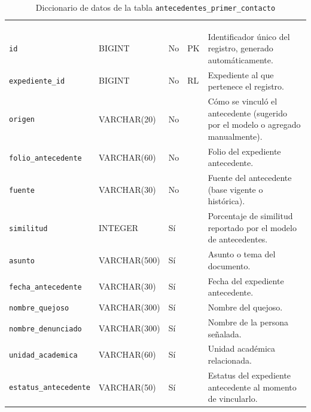 \footnotesize
\renewcommand{\arraystretch}{1.15}
\setlength{\tabcolsep}{4pt}
\begin{longtable}{|L{3.9cm}|L{2.4cm}|L{0.9cm}|L{1.2cm}|L{6.6cm}|}
	\hiderowcolors\caption{Diccionario de datos de la tabla \texttt{antecedentes\_primer\_contacto}}
	\label{tab:dic_antecedentes_primer_contacto} \\ \showrowcolors
	\hline
	 &  &  &  &  \\
	\hline
	\endfirsthead
	\hline
	 &  &  &  &  \\
	\hline
	\endhead
		\texttt{id} & BIGINT & No & PK & Identificador único del registro, generado automáticamente. \\ \hline
		\texttt{expediente\_\allowbreak{}id} & BIGINT & No & RL & Expediente al que pertenece el registro. \\ \hline
		\texttt{origen} & VARCHAR(20) & No &  & Cómo se vinculó el antecedente (sugerido por el modelo o agregado manualmente). \\ \hline
		\texttt{folio\_\allowbreak{}antecedente} & VARCHAR(60) & No &  & Folio del expediente antecedente. \\ \hline
		\texttt{fuente} & VARCHAR(30) & No &  & Fuente del antecedente (base vigente o histórica). \\ \hline
		\texttt{similitud} & INTEGER & Sí &  & Porcentaje de similitud reportado por el modelo de antecedentes. \\ \hline
		\texttt{asunto} & VARCHAR(500) & Sí &  & Asunto o tema del documento. \\ \hline
		\texttt{fecha\_\allowbreak{}antecedente} & VARCHAR(30) & Sí &  & Fecha del expediente antecedente. \\ \hline
		\texttt{nombre\_\allowbreak{}quejoso} & VARCHAR(300) & Sí &  & Nombre del quejoso. \\ \hline
		\texttt{nombre\_\allowbreak{}denunciado} & VARCHAR(300) & Sí &  & Nombre de la persona señalada. \\ \hline
		\texttt{unidad\_\allowbreak{}academica} & VARCHAR(60) & Sí &  & Unidad académica relacionada. \\ \hline
		\texttt{estatus\_\allowbreak{}antecedente} & VARCHAR(50) & Sí &  & Estatus del expediente antecedente al momento de vincularlo. \\ \hline

\end{longtable}
